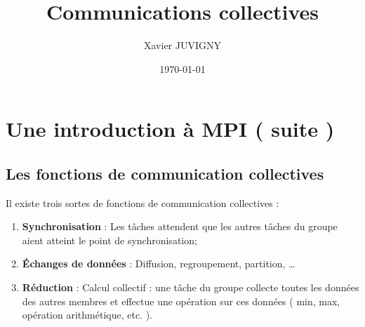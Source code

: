 \documentclass[11pt,a4paper]{article}
\author{Xavier JUVIGNY}
\date{\today}
\title{Communications collectives}
\begin{document}
\maketitle
\tableofcontents

\section{Une introduction à MPI ( suite )}
\subsection{Les fonctions de communication collectives}

Il existe trois sortes de fonctions de communication collectives :
\begin{enumerate}
\item {\bf Synchronisation} : Les tâches attendent que les autres
tâches du groupe aient atteint le point de synchronisation;
\item {\bf \'Echanges de données} : Diffusion, regroupement, partition, \ldots
\item {\bf Réduction} : Calcul collectif : une tâche du groupe collecte
toutes les données des autres membres et effectue une opération sur
ces données ( min, max, opération arithmétique, etc. ).
\end{enumerate}
\end{document}
